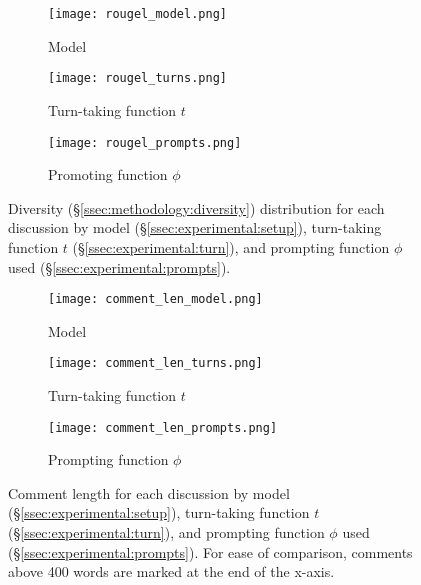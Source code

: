 \begin{figure*}[t]
    \begin{subfigure}{0.32\linewidth}
        \texttt{[image: rougel\_model.png]}
        \caption{Model}
        \label{fig:rougel_model}
    \end{subfigure}%
    \hfill
    \begin{subfigure}{0.32\linewidth}
        \texttt{[image: rougel\_turns.png]}
        \caption{Turn-taking function $t$}
        \label{fig:rougel_turns}
    \end{subfigure}%
    \hfill
    \begin{subfigure}{0.32\linewidth}
        \texttt{[image: rougel\_prompts.png]}
        \caption{Promoting function $\phi$}
        \label{fig:rougel_prompts}
    \end{subfigure}%

    \caption{Diversity (\S\ref{ssec:methodology:diversity}) distribution for each discussion by model (\S\ref{ssec:experimental:setup}), turn-taking function $t$ (\S\ref{ssec:experimental:turn}), and prompting function $\phi$ used (\S\ref{ssec:experimental:prompts}).}
    \label{fig:diversity}
\end{figure*}

\begin{figure*}[t]
    \begin{subfigure}{0.32\linewidth}
        \texttt{[image: comment\_len\_model.png]}
        \caption{Model}
        \label{fig:comment_length_model}
    \end{subfigure}%
    \hfill
    \begin{subfigure}{0.32\linewidth}
        \texttt{[image: comment\_len\_turns.png]}
        \caption{Turn-taking function $t$}
        \label{fig:comment_length_turns}
    \end{subfigure}%
    \hfill
    \begin{subfigure}{0.32\linewidth}
        \texttt{[image: comment\_len\_prompts.png]}
        \caption{Prompting function $\phi$}
        \label{fig:comment_length_prompts}
    \end{subfigure}%

    \caption{Comment length for each discussion by model (\S\ref{ssec:experimental:setup}), turn-taking function $t$ (\S\ref{ssec:experimental:turn}), and prompting function $\phi$ used (\S\ref{ssec:experimental:prompts}). For ease of comparison, comments above 400 words are marked at the end of the x-axis.}
    \label{fig:comment_length}
\end{figure*}


